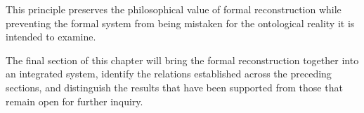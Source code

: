 This principle
preserves the
philosophical value
of formal
reconstruction while
preventing the
formal system
from being
mistaken for
the ontological
reality it
is intended
to examine.

The final
section of
this chapter
will bring
the formal
reconstruction together
into an
integrated system,
identify the
relations established
across the
preceding sections,
and distinguish
the results
that have
been supported
from those
that remain
open for
further inquiry.

